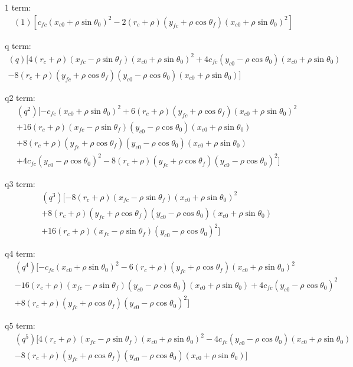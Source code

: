 \documentclass[12pt]{article}
\begin{document}
1 term:
\begin{align*}
    (1)[c_{fc}(x_{c0} + \rho\sin\theta_0)^2 -2(r_c+\rho)(y_{fc} + \rho\cos\theta_f)(x_{c0} + \rho\sin\theta_0)^2]
\end{align*}

q term:
\begin{align*}
    (q)[4(r_c+\rho)(x_{fc} - \rho\sin\theta_f)(x_{c0} + \rho\sin\theta_0)^2 + 4c_{fc}(y_{c0} - \rho\cos\theta_0)(x_{c0} + \rho\sin\theta_0)\\ -8(r_c+\rho)(y_{fc} + \rho\cos\theta_f)(y_{c0} - \rho\cos\theta_0)(x_{c0} + \rho\sin\theta_0)]
\end{align*}

q2 term:
\begin{align*}
    &(q^2)[-c_{fc}(x_{c0} + \rho\sin\theta_0)^2 +6(r_c+\rho)(y_{fc} + \rho\cos\theta_f)(x_{c0} + \rho\sin\theta_0)^2\\
    &+ 16(r_c+\rho)(x_{fc} - \rho\sin\theta_f)(y_{c0} - \rho\cos\theta_0)(x_{c0} + \rho\sin\theta_0)\\
    &+8(r_c+\rho)(y_{fc} + \rho\cos\theta_f)(y_{c0} - \rho\cos\theta_0)(x_{c0} + \rho\sin\theta_0)\\
    &+ 4c_{fc}(y_{c0} - \rho\cos\theta_0)^2 -8(r_c+\rho)(y_{fc} + \rho\cos\theta_f)(y_{c0} - \rho\cos\theta_0)^2]
\end{align*}

q3 term:
\begin{align*}
    &(q^3)[ -8(r_c+\rho)(x_{fc} - \rho\sin\theta_f)(x_{c0} + \rho\sin\theta_0)^2\\
    &+8(r_c+\rho)(y_{fc} + \rho\cos\theta_f)(y_{c0} - \rho\cos\theta_0)(x_{c0} + \rho\sin\theta_0)\\
    &+ 16(r_c+\rho)(x_{fc} - \rho\sin\theta_f)(y_{c0} - \rho\cos\theta_0)^2]
\end{align*}

q4 term:
\begin{align*}
    &(q^4)[-c_{fc}(x_{c0} + \rho\sin\theta_0)^2 -6(r_c+\rho)(y_{fc} + \rho\cos\theta_f)(x_{c0} + \rho\sin\theta_0)^2\\
    &- 16(r_c+\rho)(x_{fc} - \rho\sin\theta_f)(y_{c0} - \rho\cos\theta_0)(x_{c0} + \rho\sin\theta_0) + 4c_{fc}(y_{c0} - \rho\cos\theta_0)^2\\
    &+8(r_c+\rho)(y_{fc} + \rho\cos\theta_f)(y_{c0} - \rho\cos\theta_0)^2 ]
\end{align*}

q5 term:
\begin{align*}
    &(q^5)[ 4(r_c+\rho)(x_{fc} - \rho\sin\theta_f)(x_{c0} + \rho\sin\theta_0)^2 -4c_{fc}(y_{c0} - \rho\cos\theta_0)(x_{c0} + \rho\sin\theta_0)\\
    &-8(r_c+\rho)(y_{fc} + \rho\cos\theta_f)(y_{c0} - \rho\cos\theta_0)(x_{c0} + \rho\sin\theta_0)]
\end{align*}
\end{document}
